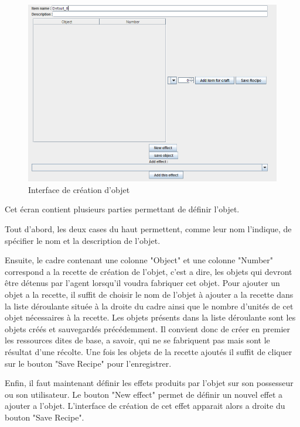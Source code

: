 \begin{figure}[!h]
\begin{center}
\includegraphics[scale = 0.7]{images/ecran.png}
\caption[eff]{Interface de création d'objet \\}
\label{Interface de création d'objet}
\end{center}
\end{figure}


Cet écran contient plusieurs parties permettant de définir l'objet.

Tout d'abord, les deux cases du haut permettent, comme leur nom l'indique, de spécifier le nom et la description de l'objet. 

Ensuite, le cadre contenant une colonne "Object" et une colonne "Number" correspond a la recette de création de l'objet, c'est a dire, les objets qui devront être détenus par l'agent lorsqu'il voudra fabriquer cet objet.
Pour ajouter un objet a la recette, il suffit de choisir le nom de l'objet à ajouter a la recette dans la liste déroulante située à la droite du cadre ainsi que le nombre d'unités de cet objet nécessaires à la recette. Les objets présents dans la liste déroulante sont les objets créés et sauvegardés précédemment. Il convient donc de créer en premier les ressources dites de base, a savoir, qui ne se fabriquent pas mais sont le résultat d'une récolte. Une fois les objets de la recette ajoutés il suffit de cliquer sur le bouton "Save Recipe" pour l'enregistrer.

Enfin, il faut maintenant définir les effets produits par l'objet sur son possesseur ou son utilisateur. Le bouton "New effect" permet de définir un nouvel effet a ajouter a l'objet. L'interface de création de cet effet apparait alors a droite du bouton "Save Recipe". \newline

